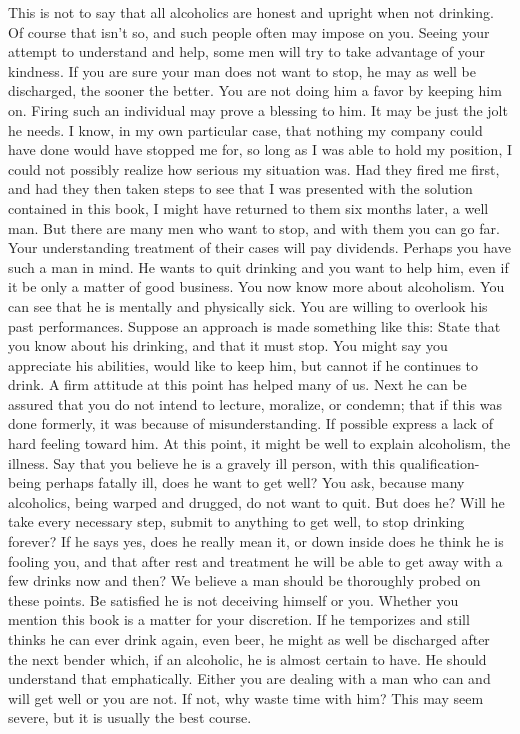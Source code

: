 \begin{biblechapter}
This is not to say that all alcoholics are honest and upright when not drinking.  Of course that isn't so, and such people often may impose on you.  Seeing your attempt to understand and help, some men will try to take advantage of your kindness.  If you are sure your man does not want to stop, he may as well be discharged, the sooner the better.  You are not doing him a favor by keeping him on.  Firing such an individual may prove a blessing to him.  It may be just the jolt he needs.  I know, in my own particular case, that nothing my company could have done would have stopped me for, so long as I was able to hold my position, I could not possibly realize how serious my situation was.  Had they fired me first, and had they then taken steps to see that I was presented with the solution contained in this book, I might have returned to them six months later, a well man.
But there are many men who want to stop, and with them you can go far.  Your understanding treatment of their cases will pay dividends.
Perhaps you have such a man in mind.  He wants to quit drinking and you want to help him, even if it be only a matter of good business.  You now know more about alcoholism.  You can see that he is mentally and physically sick.  You are willing to overlook his past performances.  Suppose an approach is made something like this:
State that you know about his drinking, and that it must stop.  You might say you appreciate his abilities, would like to keep him, but cannot if he continues to drink.  A firm attitude at this point has helped many of us.
Next he can be assured that you do not intend to lecture, moralize, or condemn; that if this was done formerly, it was because of misunderstanding.  If possible express a lack of hard feeling toward him.  At this point, it might be well to explain alcoholism, the illness.  Say that you believe he is a gravely ill person, with this qualification-being perhaps fatally ill, does he want to get well?  You ask, because many alcoholics, being warped and drugged, do not want to quit.  But does he?  Will he take every necessary step, submit to anything to get well, to stop drinking forever?
If he says yes, does he really mean it, or down inside does he think he is fooling you, and that after rest and treatment he will be able to get away with a few drinks now and then?  We believe a man should be thoroughly probed on these points.  Be satisfied he is not deceiving himself or you.
Whether you mention this book is a matter for your discretion.  If he temporizes and still thinks he can ever drink again, even beer, he might as well be discharged after the next bender which, if an alcoholic, he is almost certain to have.  He should understand that emphatically.  Either you are dealing with a man who can and will get well or you are not.  If not, why waste time with him?  This may seem severe, but it is usually the best course.

\end{biblechapter}
